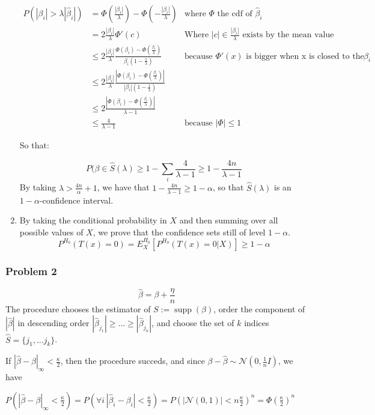 \documentclass[12pt]{article}
\newcommand{\Q}[1]{\subsubsection*{Problem #1}}
\begin{document}
\begin{enumerate}
\begin{align*}
P(|\beta_i| > \lambda |\hat \beta_i|) &= \Phi(\frac{|\beta_i|}{\lambda}) - \Phi(-\frac{|\beta_i|}{\lambda}) & \text{where $\Phi$ the cdf of $\hat \beta_i$}
\\ &= 2\frac{|\beta_i|}{\lambda} \Phi'(c) &\text{Where $|c| \in \frac{|\beta_i|}{\lambda}$ exists by the mean value theorem}
\\ &\le 2\frac{|\beta_i|}{\lambda} \frac{\Phi(\beta_i) - \Phi(\frac{\beta_i}{\lambda})}{\beta_i(1-\frac1 {\lambda}) } &\text{because $\Phi'(x)$ is bigger when x is closed to the mean $\beta_i$}
\\ &\le 2\frac{|\beta_i|}{\lambda} \frac{|\Phi(\beta_i) - \Phi(\frac{\beta_i}{\lambda})|}{|\beta_i|(1-\frac1 {\lambda}) }
\\ &\le 2 \frac{|\Phi(\beta_i) - \Phi(\frac{\beta_i}{\lambda})|}{\lambda - 1}
\\ &\le  \frac4{\lambda - 1} &\text{because $|\Phi| \le 1$}
\end{align*}

So that:

$$P(\beta \in \hat S(\lambda) \ge 1 - \sum_i \frac4 {\lambda - 1} \ge 1 - \frac{4n}{\lambda-1}$$ 
By taking $\lambda > \frac{4n} {\alpha} + 1$, we have that $1 - \frac{4n}{\lambda-1} \ge 1 - \alpha$, so that $\hat S(\lambda)$ is an $1-\alpha$-confidence interval.

\item 
By taking the conditional probability in $X$ and then summing over all possible values of $X$, we prove that the confidence sets still of level $1 - \alpha$.
$$P^{H_0}(T(x) = 0) = E^{H_0}_X[P^{H_0}(T(x) = 0|X)] \ge 1 - \alpha$$


\end{enumerate}

\Q{2}
$$\hat \beta = \beta + \frac{\eta}n$$
The procedure chooses the estimator of $S := \operatorname{supp}(\beta)$, order the component of $|\hat \beta|$ in descending order $|\hat \beta_{j_1}| \ge ... \ge |\hat \beta_{j_n}|$, and choose the set of $k$ indices $\hat S = \{j_1, ... j_k\}$.


If $|\hat \beta - \beta|_{\infty} < \frac{\kappa}2$, then the procedure succeds, and since $\beta - \hat \beta \sim \mathcal N(0, \frac1{n} I)$, we have 


$P(|\hat \beta - \beta|_{\infty} < \frac{\kappa}2) =  P(\forall i \, |\hat \beta_i - \beta_i|< \frac{\kappa}2)  = P(|\mathcal N(0,1)|< n\frac{\kappa}2)^n = \Phi(\frac{\kappa}2)^n$
\end{document}
